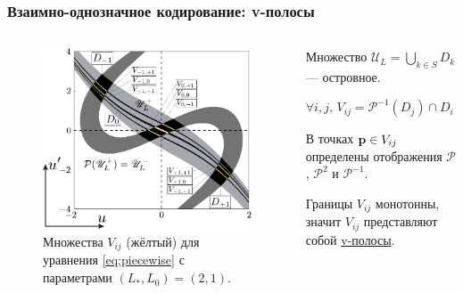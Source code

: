 \documentclass [10pt] {beamer}
\begin{document}
\begin{frame}
	\frametitle{Взаимно-однозначное кодирование: v-полосы}
	
	\begin{columns}
		\begin{column}{.5\textwidth}
			\begin{figure}
			\includegraphics[width = 1\textwidth]{pic/v-strips for piecewise equation.pdf}
			\caption{Множества $V_{ij}$ (жёлтый) для уравнения \eqref{eq:piecewise} с параметрами $(L_*, L_0) = (2, 1)$.}
			\end{figure}
		\end{column}
		\begin{column}{.5\textwidth}
			Множество $\mathscr{U}_L = \bigcup_{k \in S} D_k$ --- островное.
		
			\vspace{5pt}
		
			\begin{equation*}
				\forall i, j, \, V_{ij} = \mathcal{P}^{-1}(D_j) \cap D_i \neq \varnothing	
			\end{equation*}

			\vspace{5pt}
			
			В точках $\vb{p} \in V_{ij}$ определены отображения $\mathcal{P}$, $\mathcal{P}^2$ и $\mathcal{P}^{-1}$.
			
			\vspace{10pt}
			
			Границы $V_{ij}$ монотонны, значит $V_{ij}$ представляют собой \underline{v-полосы}.
		\end{column}
	\end{columns}
\end{frame}
\end{document}
